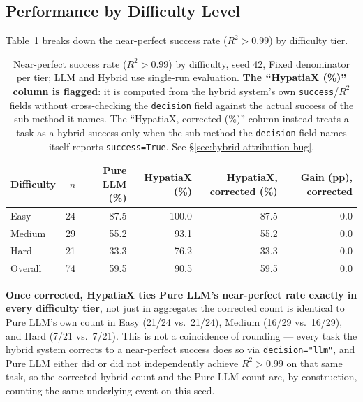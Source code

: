 \documentclass[twoside,11pt]{article}
\newcommand{\Rsq}{R^{2}}
\begin{document}
\subsection{Performance by Difficulty Level}\label{subsec:performance-by-difficulty-level}
\label{sec:difficulty}

Table~\ref{tab:difficulty} breaks down the near-perfect success rate ($\Rsq > 0.99$)
by difficulty tier.

\begin{table}[h]
\centering
\caption{Near-perfect success rate ($\Rsq > 0.99$) by difficulty, seed 42,
Fixed denominator per tier; LLM and Hybrid use single-run evaluation.
\textbf{The ``HypatiaX (\%)'' column is flagged}: it is computed from the
hybrid system's own \texttt{success}/$\Rsq$ fields without cross-checking the
\texttt{decision} field against the actual success of the sub-method it
names. The ``HypatiaX, corrected (\%)'' column instead treats a task as a
hybrid success only when the sub-method the \texttt{decision} field names
itself reports \texttt{success=True}. See \S\ref{sec:hybrid-attribution-bug}.}
\label{tab:difficulty}
\begin{tabular}{lrrrrr}
\toprule
Difficulty & $n$ & Pure LLM (\%) & HypatiaX (\%) & HypatiaX, corrected (\%) & Gain (pp), corrected \\
\midrule
Easy       & 24  & 87.5          & 100.0 & 87.5 & $0.0$ \\
Medium     & 29  & 55.2          & 93.1  & 55.2 & $0.0$ \\
Hard       & 21  & 33.3          & 76.2  & 33.3 & $0.0$ \\
\midrule
Overall    & 74  & 59.5          & 90.5 & 59.5 & $0.0$ \\
\bottomrule
\end{tabular}
\end{table}

\textbf{Once corrected, HypatiaX ties Pure LLM's near-perfect rate exactly in
every difficulty tier}, not just in aggregate: the corrected count is
identical to Pure LLM's own count in Easy (21/24 vs.\ 21/24), Medium (16/29
vs.\ 16/29), and Hard (7/21 vs.\ 7/21). This is not a coincidence of
rounding --- every task the hybrid system corrects to a near-perfect success
does so via \texttt{decision="llm"}, and Pure LLM either did or did not
independently achieve $\Rsq>0.99$ on that same task, so the corrected hybrid
count and the Pure LLM count are, by construction, counting the same
underlying event on this seed. 
\end{document}
